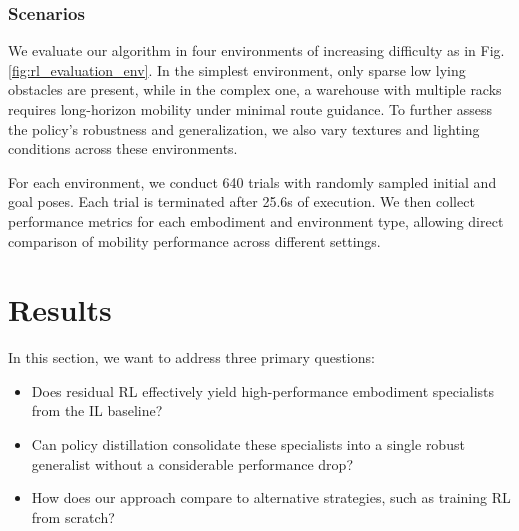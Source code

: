 \documentclass[letterpaper, 10 pt,conference]{ieeeconf}
\begin{document}
\subsubsection{Scenarios}

We evaluate our algorithm in four environments of increasing difficulty as in Fig. \ref{fig:rl_evaluation_env}. In the simplest environment, only sparse low lying obstacles are present, while in the complex one, a warehouse with multiple racks requires long-horizon mobility under minimal route guidance. To further assess the policy’s robustness and generalization, we also vary textures and lighting conditions across these environments.

For each environment, we conduct 640 trials with randomly sampled initial and goal poses. Each trial is terminated after 25.6s of execution. We then collect performance metrics for each embodiment and environment type, allowing direct comparison of mobility performance across different settings.

\section{Results} \label{sec:results}

In this section, we want to address three primary questions: 

\begin{itemize}
    \item Does residual RL effectively yield high-performance embodiment specialists from the IL baseline? 
    \item Can policy distillation consolidate these specialists into a single robust generalist without a considerable performance drop? 
    \item How does our approach compare to alternative strategies, such as training RL from scratch? 
\end{itemize}
\end{document}
